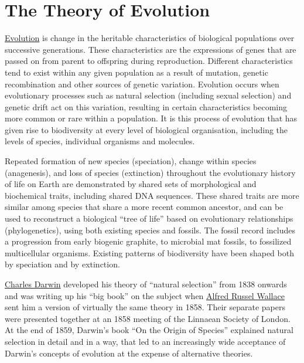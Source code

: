 \hypertarget{the-theory-of-evolution-1}{%
\chapter{The Theory of Evolution}\label{the-theory-of-evolution-1}}

\href{https://en.wikipedia.org/wiki/Evolution}{Evolution} is change in the heritable characteristics of biological populations over successive generations. These characteristics are the expressions of genes that are passed on from parent to offspring during reproduction. Different characteristics tend to exist within any given population as a result of mutation, genetic recombination and other sources of genetic variation. Evolution occurs when evolutionary processes such as natural selection (including sexual selection) and genetic drift act on this variation, resulting in certain characteristics becoming more common or rare within a population. It is this process of evolution that has given rise to biodiversity at every level of biological organisation, including the levels of species, individual organisms and molecules.

Repeated formation of new species (speciation), change within species (anagenesis), and loss of species (extinction) throughout the evolutionary history of life on Earth are demonstrated by shared sets of morphological and biochemical traits, including shared DNA sequences. These shared traits are more similar among species that share a more recent common ancestor, and can be used to reconstruct a biological ``tree of life'' based on evolutionary relationships (phylogenetics), using both existing species and fossils. The fossil record includes a progression from early biogenic graphite, to microbial mat fossils, to fossilized multicellular organisms. Existing patterns of biodiversity have been shaped both by speciation and by extinction.

\href{https://en.wikipedia.org/wiki/Charles_Darwin}{Charles Darwin} developed his theory of ``natural selection'' from 1838 onwards and was writing up his ``big book'' on the subject when \href{https://en.wikipedia.org/wiki/Alfred_Russel_Wallace}{Alfred Russel Wallace} sent him a version of virtually the same theory in 1858. Their separate papers were presented together at an 1858 meeting of the Linnaean Society of London. At the end of 1859, Darwin's book ``On the Origin of Species'' explained natural selection in detail and in a way, that led to an increasingly wide acceptance of Darwin's concepts of evolution at the expense of alternative theories.

